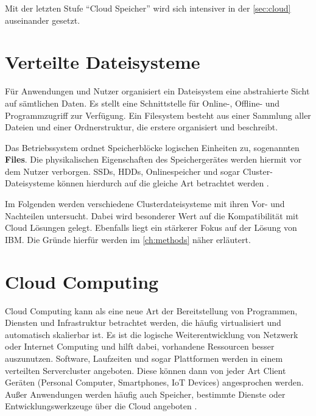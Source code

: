 Mit der letzten Stufe ``Cloud Speicher'' wird sich intensiver in der \autoref{sec:cloud} auseinander gesetzt.



\newpage

\section{Verteilte Dateisysteme} \label{sec:filesystems}

Für Anwendungen und Nutzer organisiert ein Dateisystem eine abstrahierte Sicht auf sämtlichen Daten. Es stellt eine Schnittstelle für Online-, Offline- und Programmzugriff zur Verfügung. Ein Filesystem besteht aus einer Sammlung aller Dateien und einer Ordnerstruktur, die erstere organisiert und beschreibt. 

Das Betriebssystem ordnet Speicherblöcke logischen Einheiten zu, sogenannten \textbf{Files}. Die physikalischen Eigenschaften des Speichergerätes werden hiermit vor dem Nutzer verborgen. SSDs, HDDs, Onlinespeicher und sogar Cluster-Dateisysteme können hierdurch auf die gleiche Art betrachtet werden \parencite{silberschatz.2012}.

Im Folgenden werden verschiedene Clusterdateisysteme mit ihren Vor- und Nachteilen untersucht. Dabei wird besonderer Wert auf die Kompatibilität mit Cloud Lösungen gelegt. Ebenfalls liegt ein stärkerer Fokus auf der Lösung von IBM. Die Gründe hierfür werden im \autoref{ch:methods} näher erläutert.



\section{Cloud Computing}\label{sec:cloud}

Cloud Computing kann als eine neue Art der Bereitstellung von Programmen, Diensten und Infrastruktur betrachtet werden, die häufig virtualisiert und automatisch skalierbar ist. Es ist die logische Weiterentwicklung von Netzwerk oder Internet Computing und hilft dabei, vorhandene Ressourcen besser auszunutzen. 
Software, Laufzeiten und sogar Plattformen werden in einem verteilten Servercluster angeboten. Diese können dann von jeder Art  Client Geräten (Personal Computer, Smartphones, \ac{IoT} Devices) angesprochen werden. Außer Anwendungen werden häufig  auch Speicher, bestimmte Dienste oder Entwicklungswerkzeuge über die Cloud angeboten \parencite[S. 3]{furth.2010}.

